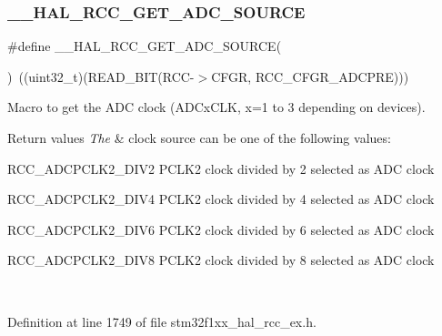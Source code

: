 \subsubsection{\texorpdfstring{\+\_\+\+\_\+\+H\+A\+L\+\_\+\+R\+C\+C\+\_\+\+G\+E\+T\+\_\+\+A\+D\+C\+\_\+\+S\+O\+U\+R\+CE}{\_\_HAL\_RCC\_GET\_ADC\_SOURCE}}
{\footnotesize\ttfamily \#define \+\_\+\+\_\+\+H\+A\+L\+\_\+\+R\+C\+C\+\_\+\+G\+E\+T\+\_\+\+A\+D\+C\+\_\+\+S\+O\+U\+R\+CE(\begin{DoxyParamCaption}{ }\end{DoxyParamCaption})~((uint32\+\_\+t)(R\+E\+A\+D\+\_\+\+B\+IT(R\+CC-\/$>$C\+F\+GR, R\+C\+C\+\_\+\+C\+F\+G\+R\+\_\+\+A\+D\+C\+P\+RE)))}



Macro to get the A\+DC clock (A\+D\+Cx\+C\+LK, x=1 to 3 depending on devices). 


\begin{DoxyRetVals}{Return values}
{\em The} & clock source can be one of the following values\+: \begin{DoxyItemize}
\item R\+C\+C\+\_\+\+A\+D\+C\+P\+C\+L\+K2\+\_\+\+D\+I\+V2 P\+C\+L\+K2 clock divided by 2 selected as A\+DC clock \item R\+C\+C\+\_\+\+A\+D\+C\+P\+C\+L\+K2\+\_\+\+D\+I\+V4 P\+C\+L\+K2 clock divided by 4 selected as A\+DC clock \item R\+C\+C\+\_\+\+A\+D\+C\+P\+C\+L\+K2\+\_\+\+D\+I\+V6 P\+C\+L\+K2 clock divided by 6 selected as A\+DC clock \item R\+C\+C\+\_\+\+A\+D\+C\+P\+C\+L\+K2\+\_\+\+D\+I\+V8 P\+C\+L\+K2 clock divided by 8 selected as A\+DC clock \end{DoxyItemize}
\\
\hline
\end{DoxyRetVals}


Definition at line 1749 of file stm32f1xx\+\_\+hal\+\_\+rcc\+\_\+ex.\+h.

